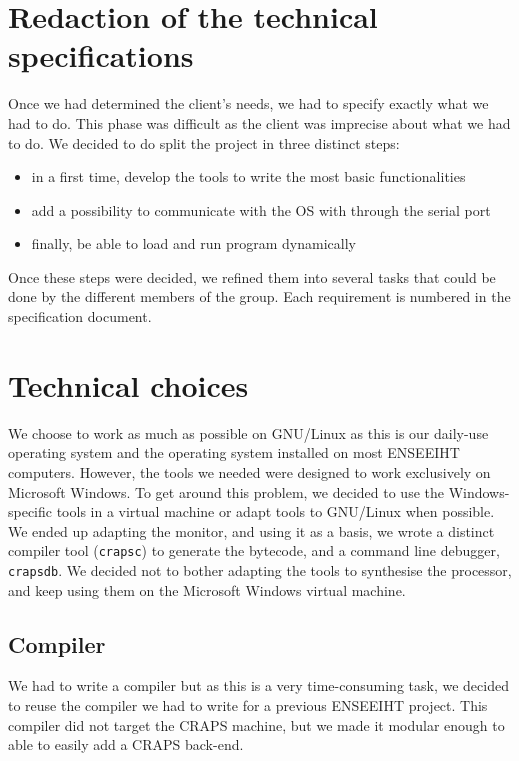 \documentclass[openany, a4paper]{book}
\begin{document}
    \section{Redaction of the technical specifications}
      Once we had determined the client's needs, we had to specify exactly what
      we had to do. This phase was difficult as the client was imprecise about
      what we had to do. We decided to do split the project in three distinct
      steps:
      \begin{itemize}
        \item in a first time, develop the tools to write the  most basic
            functionalities
        \item add a possibility to communicate with the OS with through the
            serial port
        \item finally, be able to load and run program dynamically
      \end{itemize}
      Once these steps were decided, we refined them into several tasks that
      could be done by the different members of the group.
      Each requirement is numbered in the specification document.

    \section{Technical choices}
      We choose to work as much as possible on GNU/Linux as this is our
      daily-use operating system and the operating system installed on most
      ENSEEIHT computers.
      However, the tools we needed were designed to work exclusively on
      Microsoft Windows. To get around this problem, we decided to use the
      Windows-specific tools in a virtual machine or adapt tools to GNU/Linux
      when possible. We ended up adapting the monitor, and using it as a basis,
      we wrote a distinct compiler tool (\verb+crapsc+) to generate the
      bytecode, and a command line debugger, \verb+crapsdb+. We decided not to
      bother adapting the tools to synthesise the processor, and keep using them
      on the Microsoft Windows virtual machine.

      \subsection{Compiler}
        We had to write a compiler but as this is a very time-consuming task, we
        decided to reuse the compiler we had to write for a previous ENSEEIHT
        project. This compiler did not target the CRAPS machine, but we made it
        modular enough to able to easily add a CRAPS back-end.
\end{document}
